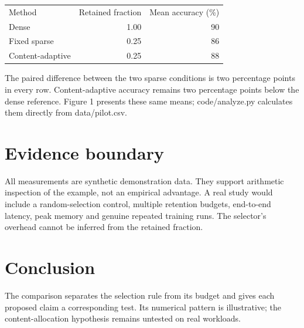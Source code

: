 \documentclass{article}
\begin{document}
\begin{center}\begin{tabular}{lrr}\hline
Method & Retained fraction & Mean accuracy (\%) \\
Dense & 1.00 & 90 \\
Fixed sparse & 0.25 & 86 \\
Content-adaptive & 0.25 & 88 \\
\hline\end{tabular}\end{center}

The paired difference between the two sparse conditions is two percentage points in every row. Content-adaptive accuracy remains two percentage points below the dense reference. Figure 1 presents these same means; code/analyze.py calculates them directly from data/pilot.csv.

\section*{Evidence boundary}

All measurements are synthetic demonstration data. They support arithmetic inspection of the example, not an empirical advantage. A real study would include a random-selection control, multiple retention budgets, end-to-end latency, peak memory and genuine repeated training runs. The selector's overhead cannot be inferred from the retained fraction.

\section*{Conclusion}

The comparison separates the selection rule from its budget and gives each proposed claim a corresponding test. Its numerical pattern is illustrative; the content-allocation hypothesis remains untested on real workloads.
\end{document}
